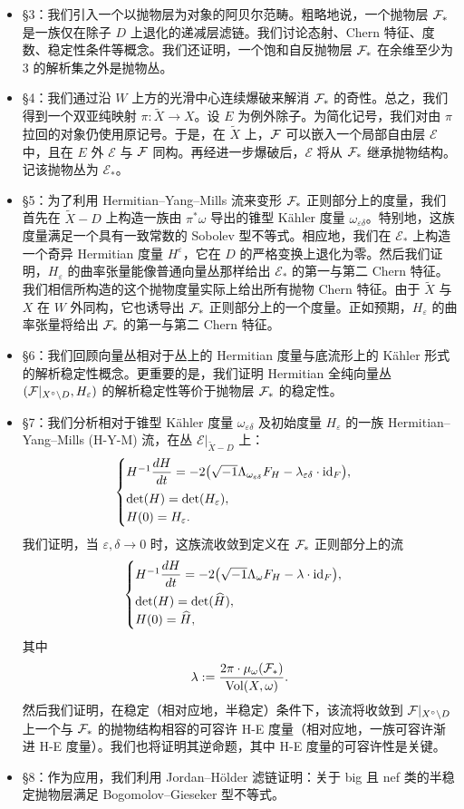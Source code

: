 \begin{itemize}
\item \S3：我们引入一个以抛物层为对象的阿贝尔范畴。粗略地说，一个抛物层 \(\mathcal{F}_{*}\) 是一族仅在除子 \(D\) 上退化的递减层滤链。我们讨论态射、Chern 特征、度数、稳定性条件等概念。我们还证明，一个饱和自反抛物层 \(\mathcal{F}_{*}\) 在余维至少为 3 的解析集之外是抛物丛。

\item \S4：我们通过沿 \(W\) 上方的光滑中心连续爆破来解消 \(\mathcal{F}_{*}\) 的奇性。总之，我们得到一个双亚纯映射 \(\pi:\widetilde X\to X\)。设 \(E\) 为例外除子。为简化记号，我们对由 \(\pi\) 拉回的对象仍使用原记号。于是，在 \(\widetilde X\) 上，\(\mathcal{F}\) 可以嵌入一个局部自由层 \(\mathcal E\) 中，且在 \(E\) 外 \(\mathcal E\) 与 \(\mathcal{F}\) 同构。再经进一步爆破后，\(\mathcal E\) 将从 \(\mathcal{F}_{*}\) 继承抛物结构。记该抛物丛为 \(\mathcal E_*\)。

\item \S5：为了利用 Hermitian--Yang--Mills 流来变形 \(\mathcal{F}_{*}\) 正则部分上的度量，我们首先在 \(\widetilde X-D\) 上构造一族由 \(\pi^*\omega\) 导出的锥型 Kähler 度量 \(\omega_{\varepsilon\delta}\)。特别地，这族度量满足一个具有一致常数的 Sobolev 型不等式。相应地，我们在 \(\mathcal E_*\) 上构造一个奇异 Hermitian 度量 \(H^\varepsilon\)，它在 \(D\) 的严格变换上退化为零。然后我们证明，\(H_\varepsilon\) 的曲率张量能像普通向量丛那样给出 \(\mathcal E_*\) 的第一与第二 Chern 特征。我们相信所构造的这个抛物度量实际上给出所有抛物 Chern 特征。由于 \(\widetilde X\) 与 \(X\) 在 \(W\) 外同构，它也诱导出 \(\mathcal{F}_{*}\) 正则部分上的一个度量。正如预期，\(H_\varepsilon\) 的曲率张量将给出 \(\mathcal{F}_{*}\) 的第一与第二 Chern 特征。

\item \S6：我们回顾向量丛相对于丛上的 Hermitian 度量与底流形上的 Kähler 形式的解析稳定性概念。更重要的是，我们证明 Hermitian 全纯向量丛 \((\mathcal{F}|_{X^\circ\setminus D},H_\varepsilon)\) 的解析稳定性等价于抛物层 \(\mathcal{F}_{*}\) 的稳定性。

\item \S7：我们分析相对于锥型 Kähler 度量 \(\omega_{\varepsilon\delta}\) 及初始度量 \(H_\varepsilon\) 的一族 Hermitian--Yang--Mills (H-Y-M) 流，在丛 \(\mathcal E|_{\widetilde X-D}\) 上：
\[
\begin{cases}
H^{-1}\dfrac{dH}{dt}
=
-2\bigl(\sqrt{-1}\Lambda_{\omega_{\varepsilon\delta}}F_H-\lambda_{\varepsilon\delta}\cdot \mathrm{id}_F\bigr),\\[0.7em]
\det(H)=\det(H_\varepsilon),\\
H(0)=H_\varepsilon.
\end{cases}
\]
我们证明，当 \(\varepsilon,\delta\to 0\) 时，这族流收敛到定义在 \(\mathcal{F}_{*}\) 正则部分上的流
\[
\begin{cases}
H^{-1}\dfrac{dH}{dt}
=
-2\bigl(\sqrt{-1}\Lambda_\omega F_H-\lambda\cdot \mathrm{id}_F\bigr),\\[0.7em]
\det(H)=\det(\widehat{H}),\\
H(0)=\widehat{H},
\end{cases}
\]
其中
\[
\lambda:=\frac{2\pi\cdot \mu_\omega(\mathcal{F}_{*})}{\operatorname{Vol}(X,\omega)}.
\]
然后我们证明，在稳定（相对应地，半稳定）条件下，该流将收敛到 \(\mathcal{F}|_{X^\circ\setminus D}\) 上一个与 \(\mathcal{F}_{*}\) 的抛物结构相容的可容许 H-E 度量（相对应地，一族可容许渐进 H-E 度量）。我们也将证明其逆命题，其中 H-E 度量的可容许性是关键。

\item \S8：作为应用，我们利用 Jordan--H\"older 滤链证明：关于 big 且 nef 类的半稳定抛物层满足 Bogomolov--Gieseker 型不等式。
\end{itemize}